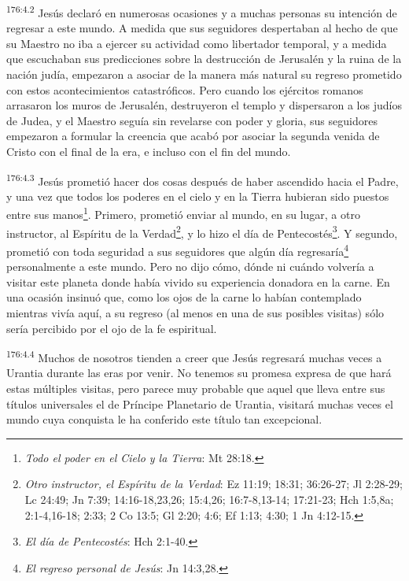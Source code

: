 \par
\textsuperscript{176:4.2} Jesús declaró en numerosas ocasiones y a muchas personas su intención de regresar a este mundo. A medida que sus seguidores despertaban al hecho de que su Maestro no iba a ejercer su actividad como libertador temporal, y a medida que escuchaban sus predicciones sobre la destrucción de Jerusalén y la ruina de la nación judía, empezaron a asociar de la manera más natural su regreso prometido con estos acontecimientos catastróficos. Pero cuando los ejércitos romanos arrasaron los muros de Jerusalén, destruyeron el templo y dispersaron a los judíos de Judea, y el Maestro seguía sin revelarse con poder y gloria, sus seguidores empezaron a formular la creencia que acabó por asociar la segunda venida de Cristo con el final de la era, e incluso con el fin del mundo.

\par
\textsuperscript{176:4.3} Jesús prometió hacer dos cosas después de haber ascendido hacia el Padre, y una vez que todos los poderes en el cielo y en la Tierra hubieran sido puestos entre sus manos\footnote{\textit{Todo el poder en el Cielo y la Tierra}: Mt 28:18.}. Primero, prometió enviar al mundo, en su lugar, a otro instructor, al Espíritu de la Verdad\footnote{\textit{Otro instructor, el Espíritu de la Verdad}: Ez 11:19; 18:31; 36:26-27; Jl 2:28-29; Lc 24:49; Jn 7:39; 14:16-18,23,26; 15:4,26; 16:7-8,13-14; 17:21-23; Hch 1:5,8a; 2:1-4,16-18; 2:33; 2 Co 13:5; Gl 2:20; 4:6; Ef 1:13; 4:30; 1 Jn 4:12-15.}, y lo hizo el día de Pentecostés\footnote{\textit{El día de Pentecostés}: Hch 2:1-40.}. Y segundo, prometió con toda seguridad a sus seguidores que algún día regresaría\footnote{\textit{El regreso personal de Jesús}: Jn 14:3,28.} personalmente a este mundo. Pero no dijo cómo, dónde ni cuándo volvería a visitar este planeta donde había vivido su experiencia donadora en la carne. En una ocasión insinuó que, como los ojos de la carne lo habían contemplado mientras vivía aquí, a su regreso (al menos en una de sus posibles visitas) sólo sería percibido por el ojo de la fe espiritual.

\par
\textsuperscript{176:4.4} Muchos de nosotros tienden a creer que Jesús regresará muchas veces a Urantia durante las eras por venir. No tenemos su promesa expresa de que hará estas múltiples visitas, pero parece muy probable que aquel que lleva entre sus títulos universales el de Príncipe Planetario de Urantia, visitará muchas veces el mundo cuya conquista le ha conferido este título tan excepcional.

